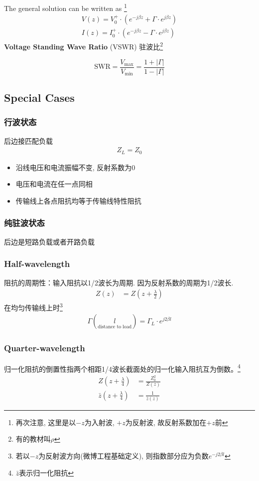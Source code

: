 \documentclass[a4paper]{report}
\begin{document}
The general solution can be written as \footnote{再次注意, 这里是以$-z$为入射波, $+z$为反射波, 故反射系数加在$+z$前}
\begin{align}
  V(z)=V_0^+\cdot(e^{-j\beta z}+\Gamma\cdot e^{j\beta z})
  \\  I(z)=I_0^+\cdot(e^{-j\beta z}-\Gamma\cdot e^{j\beta z})
\end{align}
\textbf{Voltage Standing Wave Ratio} (VSWR) 驻波比\footnote{有的教材叫$\rho$}

$$
  \text{SWR}=\frac{V_{\max}}{V_{\min}}=
  \frac{1+\lvert \Gamma \rvert}{1-\lvert \Gamma \rvert}
$$
\subsection{Special Cases}
\subsubsection{行波状态}
后边接匹配负载
\begin{align*}
  Z_L=Z_0
\end{align*}
\begin{itemize}
  \item 沿线电压和电流振幅不变, 反射系数为0
  \item 电压和电流在任一点同相
  \item 传输线上各点阻抗均等于传输线特性阻抗
\end{itemize}
\subsubsection{纯驻波状态}
后边是短路负载或者开路负载
\subsubsection{Half-wavelength}
阻抗的周期性：输入阻抗以1/2波长为周期. 因为反射系数的周期为1/2波长. 
\begin{align*}
  Z(z)&=Z(z+\frac{\lambda}{2})
\end{align*}
在均匀传输线上时\footnote{若以$-z$为反射波方向(微博工程基础定义), 则指数部分应为负数$e^{-j2\beta l}$}
\begin{align*}
   \Gamma(\underset{\text{distance to load}}{l})=\Gamma_L\cdot e^{j2\beta l}
\end{align*}
\subsubsection{Quarter-wavelength}
归一化阻抗的倒置性指两个相距1/4波长截面处的归一化输入阻抗互为倒数。\footnote{$\bar{z}$表示归一化阻抗}
\begin{align*}
  Z(z+\frac{\lambda}{4})&=\frac{Z_0^2}{Z(z)}
  \\ \bar{z} (z+\frac{\lambda}{4})&=\frac{1}{ \bar{z} (z)}
\end{align*}
\end{document}
